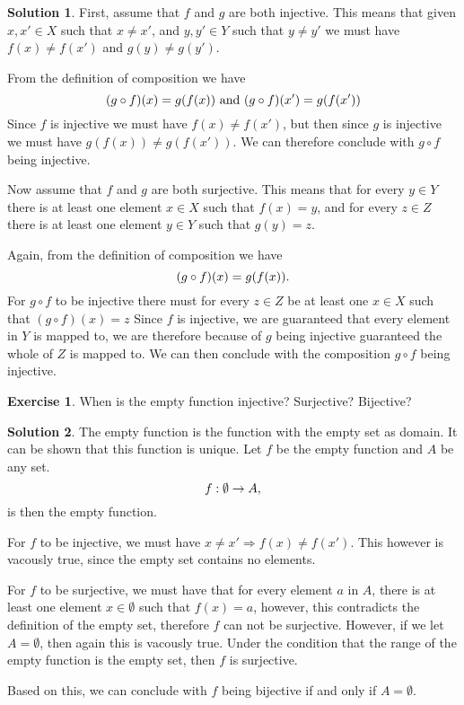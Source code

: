 \documentclass[a4paper, twocolumn]{report}
\newcounter{exercise} \numberwithin{exercise}{section}
\theoremstyle{definition}
\newtheorem{exc}[exercise]{Exercise}
\theoremstyle{solution}
\newtheorem*{sltn}{Solution}
\begin{document}
\begin{sltn}
  First, assume that $f$ and $g$ are both injective. This means that given $x,
  x' \in X$ such that $x \neq x'$, and $y, y' \in Y$ such that $y \neq y'$ we
  must have $f(x) \neq f(x')$ and $g(y) \neq g(y')$. 

  From the definition of composition we have
  \begin{equation}
    \notag
    (g \circ f)(x) = g(f(x)) \text{ and } (g \circ f)(x') = g(f(x'))
  \end{equation}
  Since $f$ is injective we must have $f(x) \neq f(x')$, but then since $g$ is
  injective we must have $g(f(x)) \neq g(f(x'))$. We can therefore conclude
  with $g \circ f$ being injective.  

  Now assume that $f$ and $g$ are both surjective. This means that for every $y
  \in Y$ there is at least one element $x \in X$ such that $f(x) = y$, and for
  every $z \in Z$ there is at least one element $y \in Y$ such that $g(y) = z$. 

  Again, from the definition of composition we have
  \begin{equation}
    \notag
    (g \circ f)(x) = g(f(x)).
  \end{equation}
  For $g \circ f$ to be injective there must for every $z \in Z$ be at least
  one $x \in X$ such that $(g \circ f)(x) = z$ Since $f$ is injective, we are
  guaranteed that every element in $Y$ is mapped to, we are therefore because
  of $g$ being injective guaranteed the whole of $Z$ is mapped to. We can then
  conclude with the composition $g \circ f$ being injective.
\end{sltn}

\begin{exc}
  When is the empty function injective? Surjective? Bijective?  
\end{exc}
\begin{sltn}
  The empty function is the function with the empty set as domain. It can be
  shown that this function is unique. Let $f$ be the empty function and $A$ be
  any set.
  \begin{equation}
    \notag
    f : \emptyset \rightarrow A, 
  \end{equation}
  is then the empty function.

  For $f$ to be injective, we must have $x \neq x' \Rightarrow f(x) \neq
  f(x')$. This however is vacously true, since the empty set contains no
  elements.

  For $f$ to be surjective, we must have that for every element $a$ in $A$,
  there is at least one element $x \in \emptyset$ such that $f(x) = a$,
  however, this contradicts the definition of the empty set, therefore $f$ can
  not be surjective. However, if we let $A = \emptyset$, then again this is
  vacously true. Under the condition that the range of the empty function is
  the empty set, then $f$ is surjective. 

  Based on this, we can conclude with $f$ being bijective if and only if $A =
  \emptyset$. 
\end{sltn}
\end{document}

